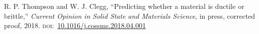 {\small\singlespacing
R. P. Thompson and W. J. Clegg, ``Predicting whether a material is ductile or brittle,'' \emph{Current Opinion in Solid State and Materials Science}, in press, corrected proof, 2018. \textsc{doi:}~\url{10.1016/j.cossms.2018.04.001}
}





















































